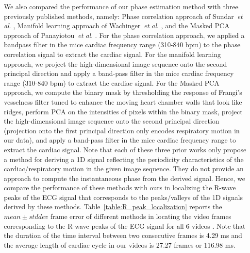 \documentclass[journal]{IEEEtran}
\newcommand{\etal}{~\textit{et al}. }
\newcommand{\rk}[1]{{\color{red}{#1}}}
\begin{document}
We also compared the performance of our phase estimation method with three previously published methods, namely: Phase correlation approach of Sundar\etal\cite{Sundar2009}, Manifold learning approach of Wachinger\etal\cite{Wachinger2012}, and the Masked PCA approach of Panayiotou\etal\cite{Panayiotou2014}. For the phase correlation approach, we applied a bandpass filter in the mice cardiac frequency range (310-840 bpm) to the phase correlation signal to extract the cardiac signal. For the manifold learning approach, we project the high-dimensional image sequence onto the second principal direction and apply a band-pass filter in the mice cardiac frequency range (310-840 bpm) to extract the cardiac signal. For the Masked PCA approach, we compute the binary mask by thresholding the response of Frangi's vesselness filter tuned to enhance the moving heart chamber walls that look like ridges, perform PCA on the intensities of pixels within the binary mask,  project the high-dimensional image sequence onto the second principal direction (projection onto the first principal direction only encodes respiratory motion in our data), and apply a band-pass filter in the mice cardiac frequency range to extract the cardiac signal. Note that each of these three prior works only propose a method for deriving a 1D signal reflecting the periodicity characteristics of the cardiac/respiratory motion in the given image sequence. They do not provide an approach to compute the instantaneous phase from the derived signal. Hence, we compare the performance of these methods with ours in localizing the R-wave peaks of the ECG signal that corresponds to the peaks/valleys of the 1D signals derived by these methods. Table~\ref{table:R_peak_localization} reports the $mean \pm stddev$ frame error of different methods in locating the video frames corresponding to the R-wave peaks of the ECG signal for all 6 videos \rk{where in the result of the best performing method for each video is highlighted in bold}. Note that the duration of the time interval between two consecutive frames is 4.29 ms and the average length of cardiac cycle in our videos is 27.27 frames or 116.98 ms.
	
\end{document}

